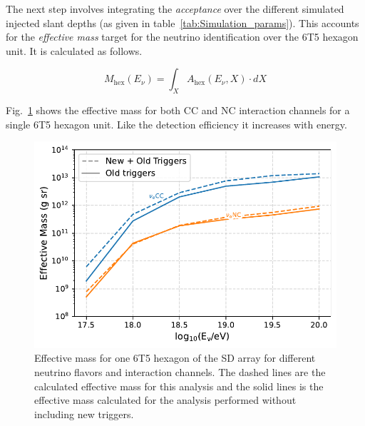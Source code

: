 The next step involves integrating the \textit{acceptance} over the different simulated injected slant depths (as given in table~\ref{tab:Simulation_params}). This accounts for the \textit{effective mass} target for the neutrino identification over the 6T5 hexagon unit. It is calculated as follows. 

\begin{equation}
  \label{eq:nu_eff_mass}
  M_{\text{hex}}(E_{\nu}) = \int_X A_{\text{hex}}(E_{\nu}, X) \cdot dX
\end{equation}

Fig.~\ref{fig:EffMass_flavors_comp} shows the effective mass for both CC and NC interaction channels for a single 6T5 hexagon unit. Like the detection efficiency it increases with energy. 

\begin{figure}[t!]
  \centering
  \includegraphics[width=14.5cm]{thesis_figures/ExpLimits/EffMass_comp_all_new_sim_optim.pdf}
  \caption{Effective mass for one 6T5 hexagon of the SD array for different neutrino flavors and interaction channels. The dashed lines are the calculated effective mass for this analysis and the solid lines is the effective mass calculated for the analysis performed without including new triggers.}
  \label{fig:EffMass_flavors_comp}
\end{figure}
